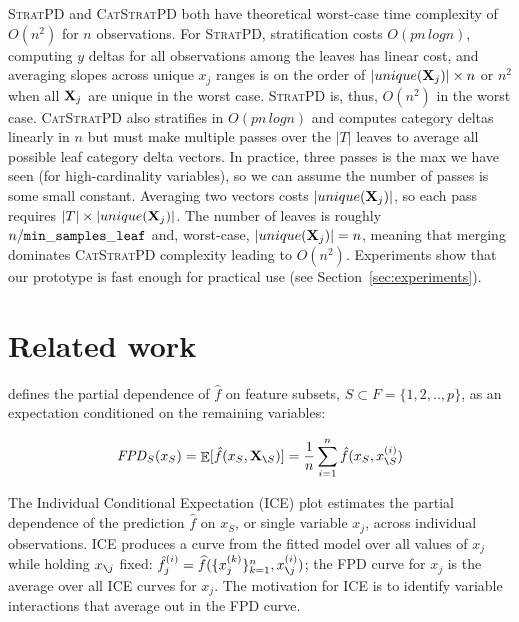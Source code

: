\documentclass{article}
\newcommand{\secref}[1]{Section~\ref{#1}}
\newcommand{\cut}[1]{}
\newcommand{\spd}{\fontfamily{cmr}\textsc{\small StratPD}}
\newcommand{\cspd}{\fontfamily{cmr}\textsc{\small CatStratPD}}
\newcommand{\xnj}{$x_{\texttt{\char`\\} j}$}
\renewcommand{\slash}{\texttt{\char`\\}}
\DeclareMathOperator{\Ex}{\mathbb{E}}
\begin{document}
\spd{} and \cspd{} both have theoretical worst-case time complexity of $O(n^2)$ for $n$ observations. For \spd{}, stratification costs $O(p n \,log n)$, computing $y$ deltas for all observations among the leaves has linear cost, and averaging slopes across unique $x_j$ ranges is on the order of $|unique({\bf X}_j)| \times n$ or $n^2$ when all ${\bf X}_j$ are unique in the worst case. \spd{} is, thus, $O(n^2)$ in the worst case.  \cspd{} also stratifies in $O(p n \,log n)$ and computes category deltas linearly in $n$ but must make multiple passes over the $|T|$ leaves to average all possible leaf category delta vectors.  In practice, three passes is the max we have seen (for high-cardinality variables), so we can assume the number of passes is some small constant. Averaging two vectors costs $|unique({\bf X}_j)|$, so each pass requires $|T| \times |unique({\bf X}_j)|$. The number of leaves is roughly $n / {\tt\small min\_samples\_leaf}$ and, worst-case, $|unique({\bf X}_j)|=n$, meaning that merging dominates \cspd{} complexity leading to $O(n^2)$.  Experiments show that our prototype is fast enough for practical use (see \secref{sec:experiments}).

\section{Related work}\label{sec:related}

\citet{PDP} defines the partial dependence of $\hat{f}$ on feature subsets, $S \subset F = \{1, 2, .., p\}$, as an expectation conditioned on the remaining variables:

\begin{equation}
{\it FPD}_S(x_S) = \Ex[\hat{f}(x_S,{\bf X}_{\slash S})] = \frac{1}{n} \sum_{i=1}^n \hat{f}(x_S, x_{\slash S}^{(i)})
\end{equation}

\cut{
\[
{\it FPD}_j(x_j=z) = \Ex[\hat{f}(x_{j}=z,{\bf X}_{\slash j})] = \frac{1}{n} \sum_{i=1}^n \hat{f}(x_j=z, x_{\slash j}^{(i)})
\]
}

\cut{
\noindent FPD replaces ${\bf X}_j$ with $z$ then computes the average model output for the altered $x^{(i)}$.
}


The Individual Conditional Expectation (ICE) plot \cite{ICE} estimates the partial dependence of the prediction $\hat{f}$ on $x_S$, or single variable $x_j$, across individual observations. ICE produces a curve from the fitted model over all values of $x_j$ while holding \xnj{} fixed: $\hat{f}^{(i)}_j = \widehat{f}(\{x_j^{(k)}\}_{k = 1}^n, x_{\slash j}^{(i)})$;  the FPD curve for  $x_j$ is the average over all ICE curves for $x_j$. The motivation for ICE is to identify variable interactions that average out in the FPD curve. 
\end{document}

